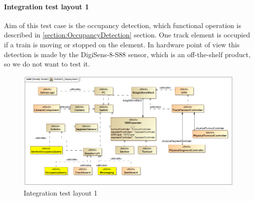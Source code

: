 \paragraph{Integration test layout 1}
Aim of this test case is the occupancy detection, which functional operation is described in \ref{section:OccupancyDetection} section. One track element is occupied if a train is moving or stopped on the element. In hardware point of view this detection is made by the DigiSens-8-S88 sensor, which is an off-the-shelf product, so we do not want to test it.  
\begin{figure}[!h]
	\centering
	\includegraphics[width=150mm, keepaspectratio]{figures/testDesign/testLayoutSYSML/MoDeS3_Deployment-test1.png}
	\caption{Integration test layout 1}
	\label{fig:MoDeS3_Deployment-test1}
\end{figure}

